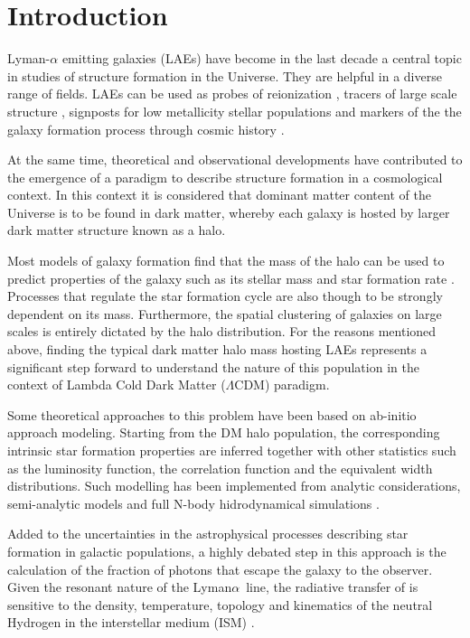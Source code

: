 \documentclass[usenatbib]{mn2e}
\newcommand{\ly}{{\ifmmode{{\rm Ly}\alpha}\else{Ly$\alpha$~}\fi}}
\newcommand{\lya}{{Lyman$\alpha$~}}
\begin{document}
\section{Introduction}

Lyman-$\alpha$ emitting galaxies (LAEs) have become in the last decade a 
central topic in studies of structure formation in the Universe. They 
are helpful in a diverse range of fields. LAEs can
be used as probes of reionization \citep{Dijkstra11}, tracers of
large scale structure \citep{Koehler2007}, 
signposts for low metallicity stellar populations and markers of the
the galaxy formation process through cosmic history \citep{ForeroRomero2012}.  


At the same time, theoretical and observational developments have
contributed to the emergence of a paradigm to describe structure
formation in a cosmological context. In this context it is considered
that dominant matter content of the Universe is to be found in dark
matter, whereby each galaxy is hosted by larger dark matter structure
known as a halo. 

Most models of galaxy formation find that the mass of the halo can be
used to predict properties of the galaxy such as its stellar mass and
star formation rate \citep{Behroozi2012}. Processes that regulate the
star formation cycle are also though to be strongly dependent on its
mass. Furthermore, the spatial clustering of galaxies on large scales
is entirely dictated by the halo distribution.  For the reasons
mentioned above, finding the typical dark matter halo mass hosting
LAEs represents a significant step forward to understand the nature of
this population in the context of Lambda Cold Dark Matter
($\Lambda$CDM) paradigm.  

Some theoretical approaches to this problem have been based on
ab-initio approach modeling. Starting from the DM halo population, the
corresponding intrinsic star formation properties are inferred
together with other statistics such as the luminosity function, the
correlation function and the equivalent width distributions. Such
modelling has been implemented from analytic considerations,
semi-analytic models  and  full N-body hidrodynamical simulations
\citep{Laursen2007, Dayal2009, ForeroRomero2011, Yajima2012, Orsi2012, Soler2012}. 

Added to the uncertainties in the astrophysical processes describing
star formation in galactic populations, a highly debated step in this
approach is the calculation of the fraction of \ly photons
that escape the galaxy to the observer. Given the resonant nature of
the \lya line, the radiative transfer of \ly is sensitive to the
density, temperature, topology and kinematics of the neutral Hydrogen
in the interstellar medium (ISM) \citep{Neufeld1991, ForeroRomero2011, Dijkstra2012,
Laursen2013,Orsi2012}.  
\end{document}
